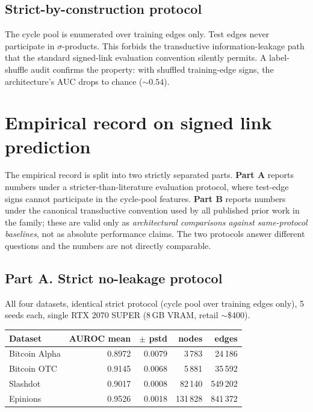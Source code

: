 \documentclass[11pt,a4paper]{article}
\newcommand{\sig}{\ensuremath{\sigma}}
\begin{document}
\subsection{Strict-by-construction protocol}

The cycle pool is enumerated over training edges only. Test edges
never participate in $\sig$-products. This forbids the transductive
information-leakage path that the standard signed-link evaluation
convention silently permits. A label-shuffle audit confirms the
property: with shuffled training-edge signs, the architecture's AUC
drops to chance ($\sim 0.54$).

\section{Empirical record on signed link prediction}

The empirical record is split into two strictly separated parts.
\textbf{Part A} reports numbers under a stricter-than-literature
evaluation protocol, where test-edge signs cannot participate in
the cycle-pool features. \textbf{Part B} reports numbers under
the canonical transductive convention used by all published prior
work in the family; these are valid only as \emph{architectural
comparisons against same-protocol baselines}, not as absolute
performance claims. The two protocols answer different questions
and the numbers are not directly comparable.

\subsection*{Part A. Strict no-leakage protocol}

All four datasets, identical strict protocol (cycle pool over
training edges only), 5 seeds each, single RTX 2070 SUPER
(8\,GB VRAM, retail $\sim$\$400).

\begin{center}
\begin{tabular}{lrrrr}
\toprule
Dataset       & AUROC mean & $\pm$ pstd & nodes & edges \\
\midrule
Bitcoin Alpha & 0.8972     & 0.0079     & 3\,783   & 24\,186     \\
Bitcoin OTC   & 0.9145     & 0.0068     & 5\,881   & 35\,592     \\
Slashdot      & 0.9017     & 0.0008     & 82\,140  & 549\,202    \\
Epinions      & 0.9526     & 0.0018     & 131\,828 & 841\,372    \\
\bottomrule
\end{tabular}
\end{center}
\end{document}

